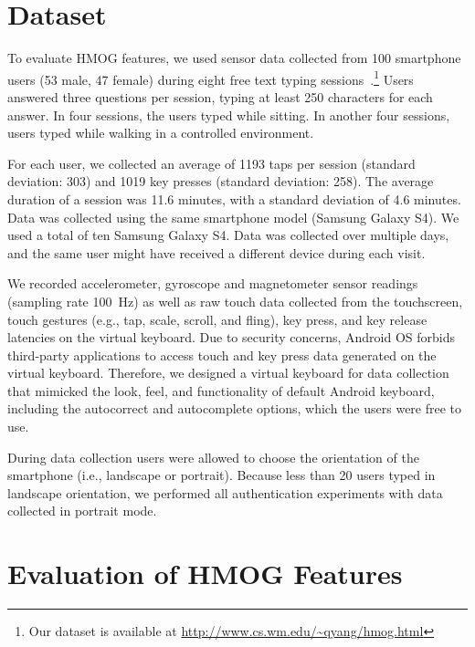 %

\section{Dataset} \label{sectionDataset}
To evaluate HMOG features, we used sensor data collected from 100 smartphone users (53 male, 47 female) during eight free text typing sessions~\cite{qingPoster}.\footnote{Our dataset is available at \url{ http://www.cs.wm.edu/~qyang/hmog.html}} Users answered three questions per session, typing at least 250 characters for each answer. In four sessions, the users typed while sitting. In another four sessions, users typed while walking in a controlled environment.

For each user, we collected an average of 1193 taps per session (standard deviation: 303) and 1019 key presses (standard deviation: 258). The average duration of a session was 11.6 minutes, with a standard deviation of 4.6 minutes.
Data was collected using the same smartphone model (Samsung Galaxy S4). We used a total of ten Samsung Galaxy S4. Data was collected over multiple days, and the same user might have received a different device during each visit.

%
%
%
%
%
%
%
%
%
%
%
%
%
%
%
%
%
%
%

We recorded accelerometer, gyroscope and magnetometer sensor readings (sampling 
rate 100~Hz) as well as raw touch data collected from the touchscreen, touch 
gestures (e.g., tap, scale, scroll, and fling), key press, and key release 
latencies on the virtual keyboard. Due to security concerns, Android OS forbids 
third-party applications to access touch and key press data generated on the 
virtual keyboard. Therefore, we designed a virtual keyboard for data collection 
that mimicked the look, feel, and functionality of default Android keyboard, 
including the autocorrect and autocomplete options, which the users were free to use.

During data collection users were allowed to choose the orientation of the 
smartphone (i.e., landscape or portrait). Because less than 20 users typed in landscape orientation, we performed all authentication experiments with data collected in portrait mode.



\section{Evaluation of HMOG Features} \label{sectionExperiments} 


